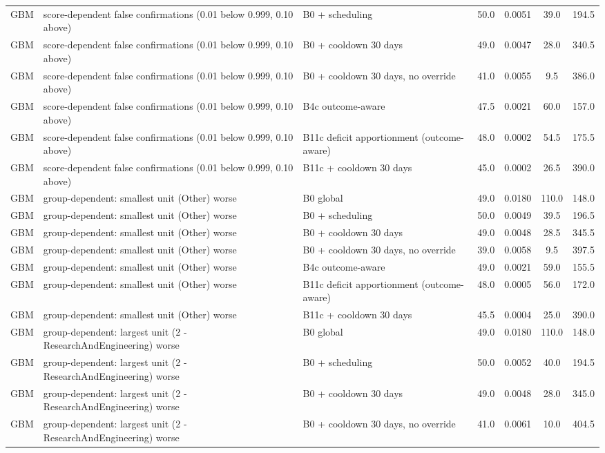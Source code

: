 \begin{longtable}{lp{5.2cm}p{4.4cm}cccc}
GBM & score-dependent false confirmations (0.01 below 0.999, 0.10 above) & B0 + scheduling & 50.0 & 0.0051 & 39.0 & 194.5 \\
GBM & score-dependent false confirmations (0.01 below 0.999, 0.10 above) & B0 + cooldown 30 days & 49.0 & 0.0047 & 28.0 & 340.5 \\
GBM & score-dependent false confirmations (0.01 below 0.999, 0.10 above) & B0 + cooldown 30 days, no override & 41.0 & 0.0055 & 9.5 & 386.0 \\
GBM & score-dependent false confirmations (0.01 below 0.999, 0.10 above) & B4c outcome-aware & 47.5 & 0.0021 & 60.0 & 157.0 \\
GBM & score-dependent false confirmations (0.01 below 0.999, 0.10 above) & B11c deficit apportionment (outcome-aware) & 48.0 & 0.0002 & 54.5 & 175.5 \\
GBM & score-dependent false confirmations (0.01 below 0.999, 0.10 above) & B11c + cooldown 30 days & 45.0 & 0.0002 & 26.5 & 390.0 \\
GBM & group-dependent: smallest unit (Other) worse & B0 global & 49.0 & 0.0180 & 110.0 & 148.0 \\
GBM & group-dependent: smallest unit (Other) worse & B0 + scheduling & 50.0 & 0.0049 & 39.5 & 196.5 \\
GBM & group-dependent: smallest unit (Other) worse & B0 + cooldown 30 days & 49.0 & 0.0048 & 28.5 & 345.5 \\
GBM & group-dependent: smallest unit (Other) worse & B0 + cooldown 30 days, no override & 39.0 & 0.0058 & 9.5 & 397.5 \\
GBM & group-dependent: smallest unit (Other) worse & B4c outcome-aware & 49.0 & 0.0021 & 59.0 & 155.5 \\
GBM & group-dependent: smallest unit (Other) worse & B11c deficit apportionment (outcome-aware) & 48.0 & 0.0005 & 56.0 & 172.0 \\
GBM & group-dependent: smallest unit (Other) worse & B11c + cooldown 30 days & 45.5 & 0.0004 & 25.0 & 390.0 \\
GBM & group-dependent: largest unit (2 - ResearchAndEngineering) worse & B0 global & 49.0 & 0.0180 & 110.0 & 148.0 \\
GBM & group-dependent: largest unit (2 - ResearchAndEngineering) worse & B0 + scheduling & 50.0 & 0.0052 & 40.0 & 194.5 \\
GBM & group-dependent: largest unit (2 - ResearchAndEngineering) worse & B0 + cooldown 30 days & 49.0 & 0.0048 & 28.0 & 345.0 \\
GBM & group-dependent: largest unit (2 - ResearchAndEngineering) worse & B0 + cooldown 30 days, no override & 41.0 & 0.0061 & 10.0 & 404.5 \\

\end{longtable}
